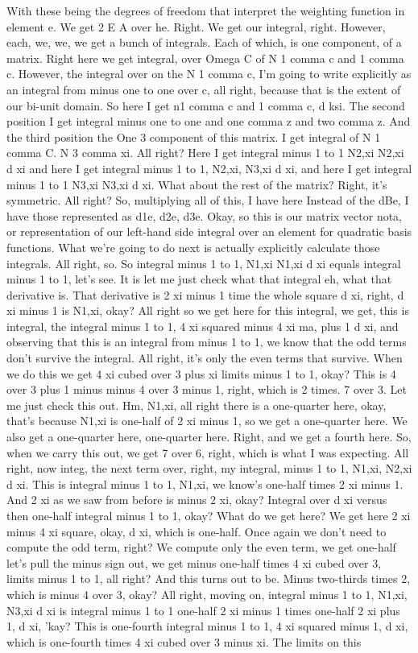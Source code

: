 \documentclass[10pt]{article}
\begin{document}
With these being the degrees of freedom that interpret the weighting function in element e. We get 2 E A over he. Right. We get our integral, right. However, each, we, we, we get a bunch of integrals. Each of which, is one component, of a matrix. Right here we get integral, over Omega C of N 1 comma c and 1 comma c. However, the integral over on the N 1 comma c, I'm going to write explicitly as an integral from minus one to one over c, all right, because that is the extent of our bi-unit domain. So here I get n1 comma c and 1 comma c, d ksi. The second position I get integral minus one to one and one comma z and two comma z. And the third position the One 3 component of this matrix. I get integral of N 1 comma C. N 3 comma xi. All right? Here I get integral minus 1 to 1 N2,xi N2,xi d xi and here I get integral minus 1 to 1, N2,xi, N3,xi d xi, and here I get integral minus 1 to 1 N3,xi N3,xi d xi. What about the rest of the matrix? Right, it's symmetric. All right? So, multiplying all of this, I have here Instead of the dBe, I have those represented as d1e, d2e, d3e. Okay, so this is our matrix vector nota, or representation of our left-hand side integral over an element for quadratic basis functions. What we're going to do next is actually explicitly calculate those integrals. All right, so. So integral minus 1 to 1, N1,xi N1,xi d xi equals integral minus 1 to 1, let's see. It is let me just check what that integral eh, what that derivative is. That derivative is 2 xi minus 1 time the whole square d xi, right, d xi minus 1 is N1,xi, okay? All right so we get here for this integral, we get, this is integral, the integral minus 1 to 1, 4 xi squared minus 4 xi ma, plus 1 d xi, and observing that this is an integral from minus 1 to 1, we know that the odd terms don't survive the integral. All right, it's only the even terms that survive. When we do this we get 4 xi cubed over 3 plus xi limits minus 1 to 1, okay? This is 4 over 3 plus 1 minus minus 4 over 3 minus 1, right, which is 2 times. 7 over 3. Let me just check this out. Hm,  N1,xi, all right there is a one-quarter here, okay, that's because N1,xi is one-half of 2 xi minus 1, so we get a one-quarter here. We also get a one-quarter here, one-quarter here. Right, and we get a fourth here. So, when we carry this out, we get 7 over 6, right, which is what I was expecting. All right, now integ, the next term over, right, my integral, minus 1 to 1, N1,xi, N2,xi d xi. This is integral minus 1 to 1, N1,xi, we know's one-half times 2 xi minus 1. And 2 xi as we saw from before is minus 2 xi, okay? Integral over d xi versus then one-half integral minus 1 to 1, okay? What do we get here? We get here 2 xi minus 4 xi square, okay, d xi, which is one-half. Once again we don't need to compute the odd term, right? We compute only the even term, we get one-half let's pull the minus sign out, we get minus one-half times 4 xi cubed over 3, limits minus 1 to 1, all right? And this turns out to be. Minus two-thirds times 2, which is minus 4 over 3, okay? All right, moving on, integral minus 1 to 1, N1,xi, N3,xi d xi is integral minus 1 to 1 one-half 2 xi minus 1 times one-half 2 xi plus 1, d xi, 'kay? This is one-fourth integral minus 1 to 1, 4 xi squared minus 1, d xi, which is one-fourth times 4 xi cubed over 3 minus xi. The limits on this 
\end{document}
